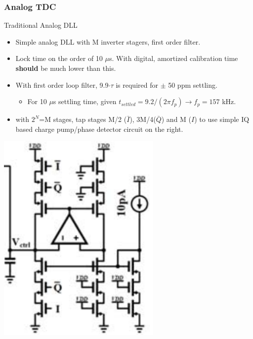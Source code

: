 \documentclass[t, screen, aspectratio=43]{beamer}
\begin{document}
\begin{frame}
	\frametitle{Analog TDC}
	\begin{block}{Traditional Analog DLL}
		\begin{minipage}{7cm}
		\vspace{1em}
		\begin{itemize}
			\scriptsize
			\item Simple analog DLL with M inverter stagers, first order filter.
			\item Lock time on the order of 10 $ \mu$s. With digital, amortized calibration time \textbf{should} be much lower than this.
			\item With first order loop filter, 9.9$\cdot\tau$ is required for $\pm$ 50 ppm settling.
			\begin{itemize}
				\scriptsize
				\item For 10 $ \mu$s settling time, given $t_{settled} = 9.2/(2\pi f_p) \rightarrow f_p = 157$ kHz.
			\end{itemize}
			\item with $2^N$=M stages, tap stages M/2 ($\bar{I}$), 3M/4($\bar{Q}$) and M ($I$) to use simple IQ based charge pump/phase detector circuit on the right.
		\end{itemize} 	
		\end{minipage}%
		\begin{minipage}{5cm}
		\center\includegraphics[width=0.6\textwidth, angle=0]{cp_lf.png}
		\end{minipage} 
	\end{block}
\end{frame}
\end{document}
